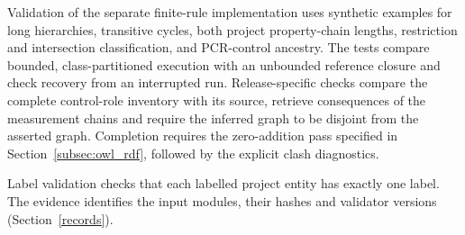 \begin{revision}
Validation of the separate finite-rule implementation uses synthetic examples for long
hierarchies, transitive cycles, both project property-chain lengths,
restriction and intersection classification, and PCR-control ancestry.
The tests compare bounded, class-partitioned execution with an
unbounded reference closure and check recovery from an interrupted
run. Release-specific checks compare the complete control-role
inventory with its source, retrieve consequences of the measurement
chains and require the inferred graph to be disjoint from the
asserted graph. Completion requires the zero-addition pass specified
in Section~\ref{subsec:owl_rdf}, followed by the explicit clash
diagnostics.

Label validation checks that each labelled project entity has exactly one
label. The evidence identifies the input modules, their hashes and validator
versions (Section~\ref{records}).

\end{revision}
